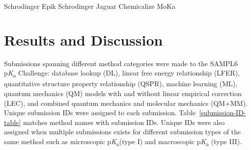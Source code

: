 \documentclass[9pt,lineno,final]{elife}
\newcommand{\pKa}{p\textit{K}\textsubscript{a}}
\begin{document}
Schrodinger Epik
Schrodinger Jaguar
Chemicalize
MoKa


\section{Results and Discussion}

 Submissions spanning different method categories were made to the SAMPL6 \pKa{} Challenge: database lookup (DL), linear free energy relationship (LFER), quantitative structure property relationship (QSPR), machine learning (ML), quantum mechanics (QM) models with and without linear empirical correction (LEC), and combined quantum mechanics and molecular mechanics (QM+MM). Unique submission IDs were assigned to each submission. Table~\ref{submission-ID-table} matches method names with submission IDs. Unique IDs were also assigned when multiple submissions exists for different submission types of the same method such as microscopic \pKa{}(type I) and macroscopic \pKa{} (type III). 
\end{document}
